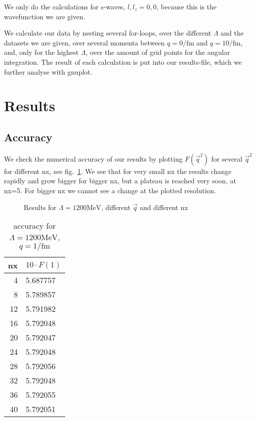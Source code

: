 \documentclass{scrartcl}
\begin{document}
We only do the calculations for s-waves, $l, l_z=0,0$, because this is the wavefunction we are given.

We calculate our data by nesting several for-loops, over the different $\Lambda$ and the datasets we are given, over several momenta between $q=0\si{\per\femto\meter}$ and $q=10\si{\per\femto\meter}$, and, only for the highest $\Lambda$, over the amount of grid points for the angular integration. The result of each calculation is put into our results-file, which we further analyse with gnuplot.

\section{Results}
\subsection{Accuracy}

We check the numerical accuracy of our results by plotting $F(\vec{q}^2)$ for several $\vec{q}^2$ for different nx, see fig.~\ref{fig:accuracy}. We see that for very small nx the results change rapidly and grow bigger for bigger nx, but a plateau is reached very soon, at nx=5. For bigger nx we cannot see a change at the plotted resolution. 

\begin{figure}[htbp]
	
	\caption{Results for $\Lambda=1200\si{\mega\electronvolt}$, different $\vec{q}$ and different nx}
	\label{fig:accuracy}
\end{figure}

\begin{table}[htbp]
	\begin{center}
		\begin{tabular}{r|l}
			nx&$10\cdot F(1)$\\ \hline
			4	&5.687757\\
			8	&5.789857\\
			12	&5.791982\\
			16	&5.792048\\
			20	&5.792047\\
			24	&5.792048\\
			28	&5.792056\\
			32	&5.792048\\
			36	&5.792055\\
			40	&5.792051\\
		\end{tabular}
	\end{center}
	\caption{accuracy for $\Lambda=1200\si{\mega\electronvolt}$, $q=1\si{\per\femto\meter}$}
	\label{tab:accuracy}
\end{table}
	
\end{document}
